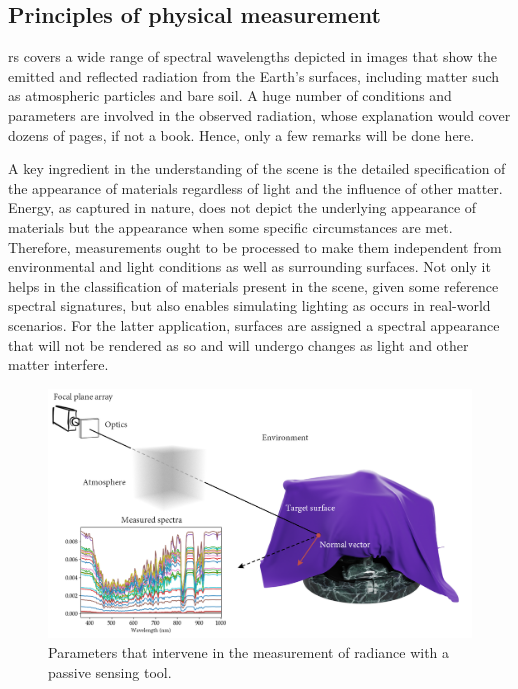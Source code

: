 \subsection{Principles of physical measurement}

\acrshort{rs} covers a wide range of spectral wavelengths depicted in images that show the emitted and reflected radiation from the Earth's surfaces, including matter such as atmospheric particles and bare soil. A huge number of conditions and parameters are involved in the observed radiation, whose explanation would cover dozens of pages, if not a book. Hence, only a few remarks will be done here. 

A key ingredient in the understanding of the scene is the detailed specification of the appearance of materials regardless of light and the influence of other matter. Energy, as captured in nature, does not depict the underlying appearance of materials but the appearance when some specific circumstances are met. Therefore, measurements ought to be processed to make them independent from environmental and light conditions as well as surrounding surfaces. Not only it helps in the classification of materials present in the scene, given some reference spectral signatures, but also enables simulating lighting as occurs in real-world scenarios. For the latter application, surfaces are assigned a spectral appearance that will not be rendered as so and will undergo changes as light and other matter interfere. 

\begin{figure}[bht]
	\includegraphics[width=\linewidth]{figs/fundamentals/physic_principles.png}
	\caption{Parameters that intervene in the measurement of radiance with a passive sensing tool. }
    \label{fig:physic_principles}
\end{figure}

